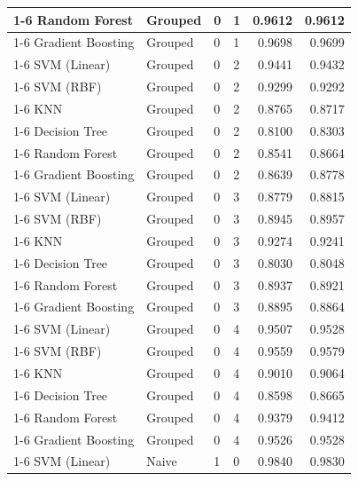 \begin{table}
\begin{tabular}{llllrr}
\cline{1-6} \cline{2-6} \cline{3-6}
Random Forest & Grouped & 0 & 1 & 0.9612 & 0.9612 \\
\cline{1-6} \cline{2-6} \cline{3-6}
Gradient Boosting & Grouped & 0 & 1 & 0.9698 & 0.9699 \\
\cline{1-6} \cline{2-6} \cline{3-6}
SVM (Linear) & Grouped & 0 & 2 & 0.9441 & 0.9432 \\
\cline{1-6} \cline{2-6} \cline{3-6}
SVM (RBF) & Grouped & 0 & 2 & 0.9299 & 0.9292 \\
\cline{1-6} \cline{2-6} \cline{3-6}
KNN & Grouped & 0 & 2 & 0.8765 & 0.8717 \\
\cline{1-6} \cline{2-6} \cline{3-6}
Decision Tree & Grouped & 0 & 2 & 0.8100 & 0.8303 \\
\cline{1-6} \cline{2-6} \cline{3-6}
Random Forest & Grouped & 0 & 2 & 0.8541 & 0.8664 \\
\cline{1-6} \cline{2-6} \cline{3-6}
Gradient Boosting & Grouped & 0 & 2 & 0.8639 & 0.8778 \\
\cline{1-6} \cline{2-6} \cline{3-6}
SVM (Linear) & Grouped & 0 & 3 & 0.8779 & 0.8815 \\
\cline{1-6} \cline{2-6} \cline{3-6}
SVM (RBF) & Grouped & 0 & 3 & 0.8945 & 0.8957 \\
\cline{1-6} \cline{2-6} \cline{3-6}
KNN & Grouped & 0 & 3 & 0.9274 & 0.9241 \\
\cline{1-6} \cline{2-6} \cline{3-6}
Decision Tree & Grouped & 0 & 3 & 0.8030 & 0.8048 \\
\cline{1-6} \cline{2-6} \cline{3-6}
Random Forest & Grouped & 0 & 3 & 0.8937 & 0.8921 \\
\cline{1-6} \cline{2-6} \cline{3-6}
Gradient Boosting & Grouped & 0 & 3 & 0.8895 & 0.8864 \\
\cline{1-6} \cline{2-6} \cline{3-6}
SVM (Linear) & Grouped & 0 & 4 & 0.9507 & 0.9528 \\
\cline{1-6} \cline{2-6} \cline{3-6}
SVM (RBF) & Grouped & 0 & 4 & 0.9559 & 0.9579 \\
\cline{1-6} \cline{2-6} \cline{3-6}
KNN & Grouped & 0 & 4 & 0.9010 & 0.9064 \\
\cline{1-6} \cline{2-6} \cline{3-6}
Decision Tree & Grouped & 0 & 4 & 0.8598 & 0.8665 \\
\cline{1-6} \cline{2-6} \cline{3-6}
Random Forest & Grouped & 0 & 4 & 0.9379 & 0.9412 \\
\cline{1-6} \cline{2-6} \cline{3-6}
Gradient Boosting & Grouped & 0 & 4 & 0.9526 & 0.9528 \\
\cline{1-6} \cline{2-6} \cline{3-6}
SVM (Linear) & Naive & 1 & 0 & 0.9840 & 0.9830 \\

\end{tabular}
\end{table}
